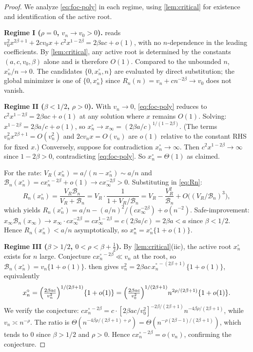 \documentclass[11pt]{article}
\theoremstyle{plain}
\theoremstyle{definition}
\theoremstyle{remark}
\begin{document}
\begin{proof}
We analyze \cref{eq:foc-poly} in each regime, using \cref{lem:critical} for existence and identification of the active root.

\medskip
\noindent\textbf{Regime I ($\rho=0$, $v_n\to v_0>0$).}
 reads $v_0^2 x^{2\beta+1}+2cv_0 x+c^2 x^{1-2\beta}=2\beta ac+o(1)$, with no $n$-dependence in the leading coefficients. By \cref{lem:critical}, any active root is determined by the constants $(a,c,v_0,\beta)$ alone and is therefore $O(1)$. Compared to the unbounded $n$, $x_n^\circ/n\to0$. The candidates $\{0,x_n^\circ,n\}$ are evaluated by direct substitution; the global minimizer is one of $\{0,x_n^\circ\}$ since $R_n(n)=v_n+cn^{-2\beta}\to v_0$ does not vanish.

\medskip
\noindent\textbf{Regime II ($\beta<1/2$, $\rho>0$).}
With $v_n\to0$, \cref{eq:foc-poly} reduces to $c^2 x^{1-2\beta}=2\beta ac+o(1)$ at any solution where $x$ remains $O(1)$. Solving: $x^{1-2\beta}=2\beta a/c+o(1)$, so $x_n^\circ\to x_\infty=(2\beta a/c)^{1/(1-2\beta)}$. (The terms $v_n^2 x^{2\beta+1}=O(v_n^2)$ and $2cv_n x=O(v_n)$ are $o(1)$ relative to the constant RHS for fixed $x$.) Conversely, suppose for contradiction $x_n^\circ\to\infty$. Then $c^2 x^{1-2\beta}\to\infty$ since $1-2\beta>0$, contradicting \cref{eq:foc-poly}. So $x_n^\circ=\Theta(1)$ as claimed.

For the rate: $V_R(x_n^\circ)=a/(n-x_n^\circ)\sim a/n$ and $\mathcal{B}_n(x_n^\circ)=cx_n^{\circ\,-2\beta}+o(1)\to cx_\infty^{-2\beta}>0$. Substituting in \cref{eq:Rn}:
\begin{equation*}
R_n(x_n^\circ)=\frac{V_R\mathcal{B}_n}{V_R+\mathcal{B}_n}=V_R\cdot\frac{1}{1+V_R/\mathcal{B}_n}=V_R-\frac{V_R^2}{\mathcal{B}_n}+O\bigl((V_R/\mathcal{B}_n)^3\bigr),
\end{equation*}
which yields $R_n(x_n^\circ)=a/n-(a/n)^2/(cx_\infty^{-2\beta})+o(n^{-2})$. Safe-improvement: $x_\infty\mathcal{B}_n(x_\infty)\to x_\infty\cdot cx_\infty^{-2\beta}=cx_\infty^{1-2\beta}=c(2\beta a/c)=2\beta a<a$ since $\beta<1/2$. Hence $R_n(x_n^\circ)<a/n$ asymptotically, so $x_n^\star=x_n^\circ\{1+o(1)\}$.

\medskip
\noindent\textbf{Regime III ($\beta>1/2$, $0<\rho<\beta+\tfrac12$).}
By \cref{lem:critical}(iic), the active root $x_n^\circ$ exists for $n$ large. Conjecture $cx_n^{\circ\,-2\beta}\ll v_n$ at the root, so $\mathcal{B}_n(x_n^\circ)=v_n\{1+o(1)\}$.  then gives $v_n^2=2\beta ac\,x_n^{\circ\,-(2\beta+1)}\{1+o(1)\}$, equivalently
\begin{equation*}
x_n^\circ=\Bigl(\tfrac{2\beta ac}{v_n^2}\Bigr)^{1/(2\beta+1)}\{1+o(1)\}=\Bigl(\tfrac{2\beta ac}{v_0^2}\Bigr)^{1/(2\beta+1)}n^{2\rho/(2\beta+1)}\{1+o(1)\}.
\end{equation*}
We verify the conjecture: $cx_n^{\circ\,-2\beta}=c\cdot[2\beta ac/v_0^2]^{-2\beta/(2\beta+1)}n^{-4\beta\rho/(2\beta+1)}$, while $v_n\asymp n^{-\rho}$. The ratio is $\Theta(n^{-4\beta\rho/(2\beta+1)+\rho})=\Theta(n^{-\rho(2\beta-1)/(2\beta+1)})$, which tends to $0$ since $\beta>1/2$ and $\rho>0$. Hence $cx_n^{\circ\,-2\beta}=o(v_n)$, confirming the conjecture.


\end{proof}
\end{document}
